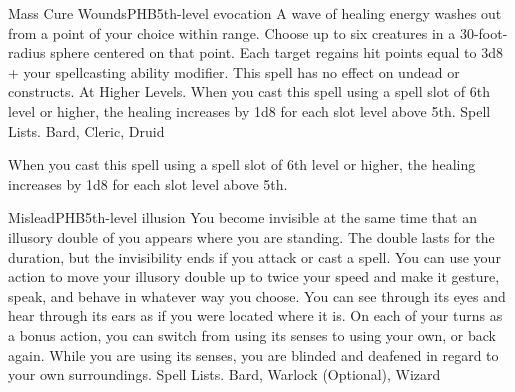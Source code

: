 \begin{spell}{Mass Cure Wounds}{PHB}{5th-level evocation}
{
}
A wave of healing energy washes out from a point of your choice within range. Choose up to six creatures in a 30-foot-radius sphere centered on that point. Each target regains hit points equal to 3d8 + your spellcasting ability modifier. This spell has no effect on undead or constructs.
At Higher Levels. When you cast this spell using a spell slot of 6th level or higher, the healing increases by 1d8 for each slot level above 5th.
Spell Lists. Bard, Cleric, Druid

 When you cast this spell using a spell slot of 6th level or higher, the healing increases by 1d8 for each slot level above 5th.
\end{spell}

\begin{spell}{Mislead}{PHB}{5th-level illusion}
{
}
You become invisible at the same time that an illusory double of you appears where you are standing. The double lasts for the duration, but the invisibility ends if you attack or cast a spell.
You can use your action to move your illusory double up to twice your speed and make it gesture, speak, and behave in whatever way you choose.
You can see through its eyes and hear through its ears as if you were located where it is. On each of your turns as a bonus action, you can switch from using its senses to using your own, or back again. While you are using its senses, you are blinded and deafened in regard to your own surroundings.
Spell Lists. Bard, Warlock (Optional), Wizard
\end{spell}

